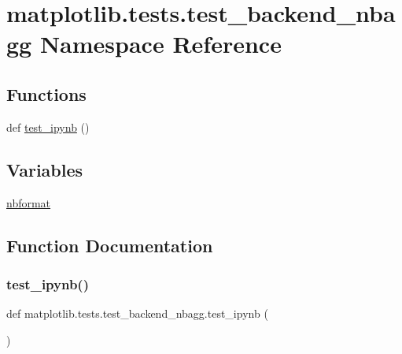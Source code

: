 \hypertarget{namespacematplotlib_1_1tests_1_1test__backend__nbagg}{}\section{matplotlib.\+tests.\+test\+\_\+backend\+\_\+nbagg Namespace Reference}
\label{namespacematplotlib_1_1tests_1_1test__backend__nbagg}
\subsection*{Functions}
\begin{DoxyCompactItemize}
\item 
def \hyperlink{namespacematplotlib_1_1tests_1_1test__backend__nbagg_aa91a2cc9d085b390afba966006a86196}{test\+\_\+ipynb} ()
\end{DoxyCompactItemize}
\subsection*{Variables}
\begin{DoxyCompactItemize}
\item 
\hyperlink{namespacematplotlib_1_1tests_1_1test__backend__nbagg_aa5b43279b6f9326b4bc69e0768cdb7a7}{nbformat}
\end{DoxyCompactItemize}


\subsection{Function Documentation}
\mbox{\label{namespacematplotlib_1_1tests_1_1test__backend__nbagg_aa91a2cc9d085b390afba966006a86196}} 
\subsubsection{\texorpdfstring{test\+\_\+ipynb()}{test\_ipynb()}}
{\footnotesize\ttfamily def matplotlib.\+tests.\+test\+\_\+backend\+\_\+nbagg.\+test\+\_\+ipynb (\begin{DoxyParamCaption}{ }\end{DoxyParamCaption})}



